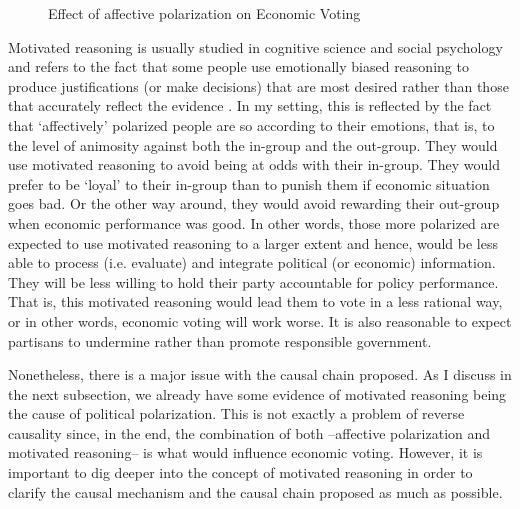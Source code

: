 \documentclass[a4paper, svgnames]{article}
\begin{document}
\begin{figure}[H]
	\centering
	\caption{\label{fig:model} Effect of affective polarization on Economic Voting}
\end{figure}

Motivated reasoning is usually studied in cognitive science and social psychology and refers to the fact that some people use emotionally biased reasoning to produce justifications (or make decisions) that are most desired rather than those that accurately reflect the evidence \citep{Kunda1990}. In my setting, this is reflected by the fact that `affectively' polarized people are so according to their emotions, that is, to the level of animosity against both the in-group and the out-group. They would use motivated reasoning to avoid being at odds with their in-group. They would prefer to be `loyal' to their in-group than to punish them if economic situation goes bad. Or the other way around, they would avoid rewarding their out-group when economic performance was good. In other words, those more polarized are expected to use motivated reasoning to a larger extent and hence, would be less able to process (i.e. evaluate) and integrate political (or economic) information. They will be less willing to hold their party accountable for policy performance. That is, this motivated reasoning would lead them to vote in a less rational way, or in other words, economic voting will work worse. It is also reasonable to expect partisans to undermine rather than promote responsible government.

Nonetheless, there is a major issue with the causal chain proposed. As I discuss in the next subsection, we already have some evidence of motivated reasoning being the cause of political polarization. This is not exactly a problem of reverse causality since, in the end, the combination of both --affective polarization and motivated reasoning-- is what would influence economic voting. However, it is important to dig deeper into the concept of motivated reasoning in order to clarify the causal mechanism and the causal chain proposed as much as possible.
\end{document}
